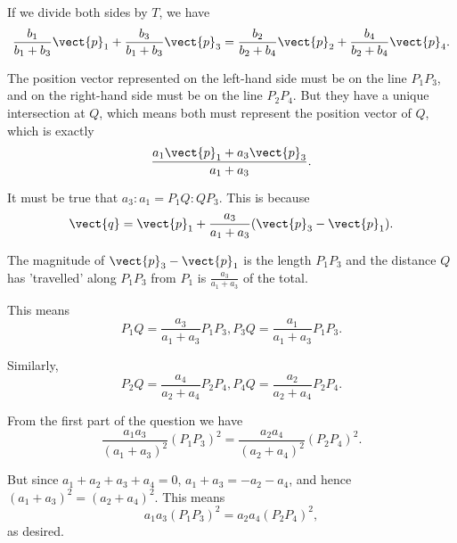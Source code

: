 \begin{enumerate}
          If we divide both sides by \(T\), we have
          \[
              \frac{b_1}{b_1 + b_3} \vect{p}_1 + \frac{b_3}{b_1 + b_3} \vect{p}_3 = \frac{b_2}{b_2 + b_4}\vect{p}_2 + \frac{b_4}{b_2 + b_4}\vect{p}_4.
          \]

          The position vector represented on the left-hand side must be on the line \(P_1 P_3\), and on the right-hand side must be on the line \(P_2 P_4\). But they have a unique intersection at \(Q\), which means both must represent the position vector of \(Q\), which is exactly
          \[
              \frac{a_1 \vect{p}_1 + a_3 \vect{p}_3}{a_1 + a_3}.
          \]

          It must be true that \(a_3 : a_1 = P_1Q : QP_3\). This is because
          \[
              \vect{q} = \vect{p}_1 + \frac{a_3}{a_1 + a_3} (\vect{p}_3 - \vect{p}_1).
          \]

          The magnitude of \(\vect{p}_3 - \vect{p}_1\) is the length \(P_1 P_3\) and the distance \(Q\) has 'travelled' along \(P_1 P_3\) from \(P_1\) is \(\frac{a_3}{a_1 + a_3}\) of the total.

          This means
          \[
              P_1 Q = \frac{a_3}{a_1 + a_3} P_1 P_3, P_3 Q = \frac{a_1}{a_1 + a_3} P_1 P_3.
          \]

          Similarly,
          \[
              P_2 Q = \frac{a_4}{a_2 + a_4} P_2 P_4, P_4 Q = \frac{a_2}{a_2 + a_4} P_2 P_4.
          \]

          From the first part of the question we have
          \[
              \frac{a_1 a_3}{(a_1 + a_3)^2} (P_1 P_3)^2 = \frac{a_2 a_4}{(a_2 + a_4)^2} (P_2 P_4)^2.
          \]

          But since \(a_1 + a_2 + a_3 + a_4 = 0\), \(a_1 + a_3 = -a_2 - a_4\), and hence \((a_1 + a_3)^2 = (a_2 + a_4)^2\). This means
          \[
              a_1 a_3 (P_1 P_3)^2 = a_2 a_4 (P_2 P_4)^2,
          \]
          as desired.
\end{enumerate}